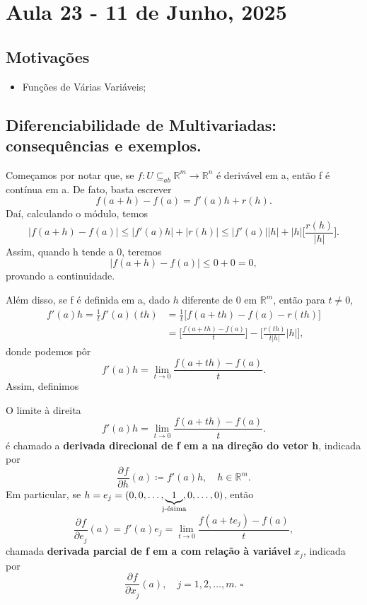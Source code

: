 \documentclass[../analysisII_notes.tex]{subfiles}
\begin{document}
\section{Aula 23 - 11 de Junho, 2025}
\subsection{Motivações}
\begin{itemize}
	\item Funções de Várias Variáveis;
\end{itemize}
\subsection{Diferenciabilidade de Multivariadas: consequências e exemplos.}
Começamos por notar que, se \(f:U \subseteq_{ab} \mathbb{R}^{m}\rightarrow \mathbb{R}^{n}\) é derivável em a, então f é contínua em a. De fato, basta escrever
\[
	f(a+h) - f(a) = f'(a)h + r(h).
\]
Daí, calculando o módulo, temos
\[
	|f(a+h)-f(a)|\leq |f'(a)h|+|r(h)| \leq |f'(a)||h| + |h|\biggl[\frac{r(h)}{|h|}\biggr].
\]
Assim, quando h tende a 0, teremos
\[
	|f(a+h) - f(a)| \leq 0 + 0 = 0,
\]
provando a continuidade.

Além disso, se f é definida em a, dado \(h\) diferente de 0 em \(\mathbb{R}^{m}\), então para \(t\neq 0\),
\begin{align*}
	f'(a)h = \frac{1}{t}f'(a)(th) & = \frac{1}{t}\biggl[f(a+th) - f(a) - r(th)\biggr]                            \\
	                              & =\biggl[\frac{f(a+th)-f(a)}{t}\biggr] - \biggl[\frac{r(th)}{t|h|}|h|\biggr],
\end{align*}
donde podemos pôr
\[
	f'(a)h = \lim_{t\to 0}\frac{f(a+th) - f(a)}{t}.
\]
Assim, definimos
\begin{def*}
	O limite à direita
	\[
		f'(a)h = \lim_{t\to 0}\frac{f(a+th) - f(a)}{t}.
	\]
	é chamado a \textbf{derivada direcional de f em a na direção do vetor h}, indicada por
	\[
		\frac{\partial^{}f}{\partial h^{}}(a) \coloneqq f'(a)h, \quad h\in \mathbb{R}^{m}.
	\]
	Em particular, se \(h = e_{j} = (0, 0, \dotsc ,\underbrace{ 1}_{\mathclap{\text{j-ésima}}}, 0, \dotsc , 0)\), então
	\[
		\frac{\partial^{}f}{\partial e_{j}^{}}(a) = f'(a)e_{j} = \lim_{t\to 0}\frac{f(a+te_{j}) - f(a)}{t},
	\]
	chamada \textbf{derivada parcial de f em a com relação à variável }\(x_{j}\), indicada por
	\[
		\frac{\partial^{}f}{\partial x_{j}^{}}(a),\quad j=1, 2, \dotsc , m. \;\square
	\]
\end{def*}
\end{document}
